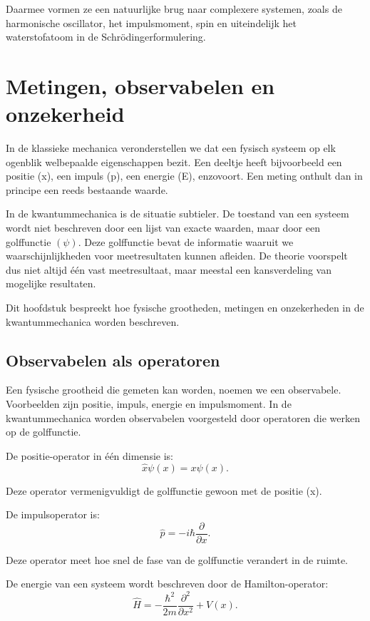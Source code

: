\documentclass{report} %
\begin{document}
    Daarmee vormen ze een natuurlijke brug naar complexere systemen, zoals de harmonische oscillator, het impulsmoment, spin en uiteindelijk het waterstofatoom in de Schrödingerformulering.


    \chapter{Metingen, observabelen en onzekerheid}

    In de klassieke mechanica veronderstellen we dat een fysisch systeem op elk ogenblik welbepaalde eigenschappen bezit. Een deeltje heeft bijvoorbeeld een positie (x), een impuls (p), een energie (E), enzovoort. Een meting onthult dan in principe een reeds bestaande waarde.

    In de kwantummechanica is de situatie subtieler. De toestand van een systeem wordt niet beschreven door een lijst van exacte waarden, maar door een golffunctie $(\psi)$. Deze golffunctie bevat de informatie waaruit we waarschijnlijkheden voor meetresultaten kunnen afleiden. De theorie voorspelt dus niet altijd één vast meetresultaat, maar meestal een kansverdeling van mogelijke resultaten.

    Dit hoofdstuk bespreekt hoe fysische grootheden, metingen en onzekerheden in de kwantummechanica worden beschreven.


    \section{Observabelen als operatoren}

    Een fysische grootheid die gemeten kan worden, noemen we een observabele. Voorbeelden zijn positie, impuls, energie en impulsmoment. In de kwantummechanica worden observabelen voorgesteld door operatoren die werken op de golffunctie.

    De positie-operator in één dimensie is:
    \[
        \hat{x}\psi(x)=x\psi(x).
    \]

    Deze operator vermenigvuldigt de golffunctie gewoon met de positie (x).

    De impulsoperator is:
    \[
        \hat{p}=-i\hbar\frac{\partial}{\partial x}.
    \]

    Deze operator meet hoe snel de fase van de golffunctie verandert in de ruimte.

    De energie van een systeem wordt beschreven door de Hamilton-operator:
    \[
        \hat{H}
        =
        -\frac{\hbar^2}{2m}\frac{\partial^2}{\partial x^2}
        +
        V(x).
    \]
\end{document}
